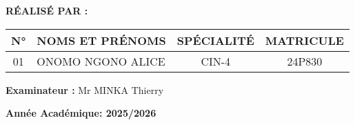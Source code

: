 \documentclass[12pt,a4paper]{article}
\begin{document}
\noindent
\textbf{RÉALISÉ PAR :} \\[1em]
\renewcommand{\arraystretch}{1.3}
\begin{tabular}{|c|m{6cm}|c|c|}
  \hline
  \textbf{N°} & \textbf{NOMS ET PRÉNOMS} & \textbf{SPÉCIALITÉ} & \textbf{MATRICULE} \\
  \hline
  01 & ONOMO NGONO ALICE  & CIN-4 & 24P830 \\
  \hline
\end{tabular}

\vspace{2cm}

\noindent
\textbf{Examinateur :} \quad Mr MINKA Thierry 

\vfill %

\begin{center}
  \Large \textbf{Année Académique: 2025/2026}
\end{center}
\end{document}

